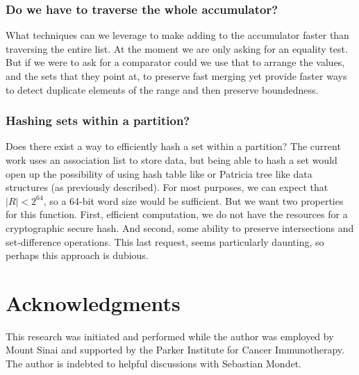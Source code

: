 \documentclass{article}
\begin{document}
\subsubsection{Do we have to traverse the whole accumulator?}

What techniques can we leverage to make adding to the accumulator
faster than traversing the entire list.
At the moment we are only asking for an equality test.
But if we were to ask for a comparator could we use that to arrange the values,
and the sets that they point at,
to preserve fast merging yet provide faster ways to detect duplicate elements
of the range and then preserve boundedness.

\subsubsection{Hashing sets within a partition?}

Does there exist a way to efficiently hash a set within a partition?
The current work uses an association list to store data, but being able to
hash a set would open up the possibility of using hash table like
or Patricia tree like data structures (as previously
described\cite{Okasaki1998}).
For most purposes,
we can expect that $|R|<2^{64}$,
so a 64-bit word size would be sufficient.
But we want two properties for this function.
First, efficient computation, we do not have the resources for a cryptographic
secure hash.
And second,
some ability to preserve intersections and set-difference operations.
This last request, seems particularly daunting,
so perhaps this approach is dubious.

\section{Acknowledgments}

This research was initiated and performed while the author was employed by
Mount Sinai and supported by the Parker Institute for Cancer Immunotherapy.
The author is indebted to helpful discussions with Sebastian Mondet.

\clearpage



\end{document}
